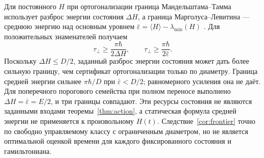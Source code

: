 {Для постоянного $H$ при ортогонализации граница Мандельштама--Тамма использует разброс энергии состояния $\Delta H$, а граница Марголуса--Левитина --- среднюю энергию над основным уровнем $\bar\varepsilon=\langle H\rangle-\lambda_{\min}(H)$ \cite{ML,GLM}. Для положительных знаменателей получаем}
\[
 \tau_\perp\geq\frac{\pi\hbar}{2\Delta H},\qquad
 \tau_\perp\geq\frac{\pi\hbar}{2\bar\varepsilon}.
\]
{Поскольку $\Delta H\leq D/2$, заданный разброс энергии состояния может дать более сильную границу, чем сертификат ортогонализации только по диаметру. Граница средней энергии сильнее $\pi\hbar/D$ при $\bar\varepsilon<D/2$; равномерного усиления она не даёт. Для поперечного порогового семейства при полном переносе выполнено $\Delta H=\bar\varepsilon=E/2$, и три границы совпадают. Эти ресурсы состояния не являются заданными входами теоремы~\ref{thm:action}, а статическая формула средней энергии не применяется к произвольному $H(t)$. Следствие~\ref{cor:frontier} точно по свободно управляемому классу с ограниченным диаметром, но не является оптимальной оценкой времени для каждого фиксированного состояния и гамильтониана.}


